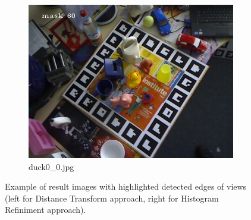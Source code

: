 \documentclass{article}
\begin{document}
\begin{figure}[H]
\begin{subfigure}{.5\textwidth}
  \includegraphics[width=.9\linewidth]{Images/duck_refinement.jpg}  
  \caption{duck0\_0.jpg}
\end{subfigure}
\caption{Example of result images with highlighted detected edges of views (left for Distance Transform approach, right for Histogram Refiniment approach).}
\label{example_matching}
\end{figure}
\end{document}

